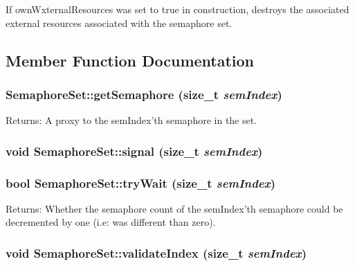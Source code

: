 If ownWxternalResources was set to true in construction, destroys the associated external resources associated with the semaphore set. 

\subsection{Member Function Documentation}
\hypertarget{classSemaphoreSet_7dc423792f197e57034c69a708194cd5}{
\subsubsection[{getSemaphore}]{ SemaphoreSet::getSemaphore (size\_\-t {\em semIndex})}}
\label{classSemaphoreSet_7dc423792f197e57034c69a708194cd5}


\begin{Desc}
\item[Returns:]A proxy to the semIndex'th semaphore in the set. \end{Desc}
\hypertarget{classSemaphoreSet_d4916e65fcf8c371854f5953c124b93f}{
\subsubsection[{signal}]{\setlength{\rightskip}{0pt plus 5cm}void SemaphoreSet::signal (size\_\-t {\em semIndex})}}
\label{classSemaphoreSet_d4916e65fcf8c371854f5953c124b93f}


\hypertarget{classSemaphoreSet_3113cf6993941fb46821140793654b14}{
\subsubsection[{tryWait}]{\setlength{\rightskip}{0pt plus 5cm}bool SemaphoreSet::tryWait (size\_\-t {\em semIndex})}}
\label{classSemaphoreSet_3113cf6993941fb46821140793654b14}


\begin{Desc}
\item[Returns:]Whether the semaphore count of the semIndex'th semaphore could be decremented by one (i.e: was different than zero). \end{Desc}
\hypertarget{classSemaphoreSet_d0d136c5b0c87651ba33ed407c8df3f1}{
\subsubsection[{validateIndex}]{\setlength{\rightskip}{0pt plus 5cm}void SemaphoreSet::validateIndex (size\_\-t {\em semIndex})}}
\label{classSemaphoreSet_d0d136c5b0c87651ba33ed407c8df3f1}


